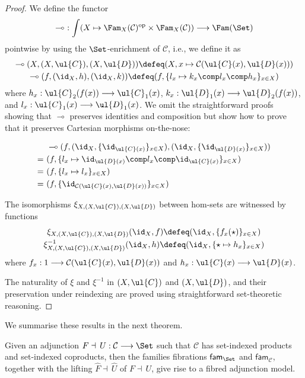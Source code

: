\begin{proof}
We define the functor 
\[
\multimap \,\,: \int (X \mapsto \Fam_X(\mathcal{C})^{\text{op}} \times \Fam_X(\mathcal{C})) \longrightarrow \Fam(\Set)
\]
pointwise by using the $\Set$-enrichment of $\mathcal{C}$, i.e., we define it as
\[
\begin{array}{c}
\multimap (X,(X,\ul{C}),(X,\ul{D})) \defeq (X,x \mapsto \mathcal{C}(\ul{C}(x),\ul{D}(x)))
\\[1mm]
\multimap (f,(\id_X,h),(\id_X,k)) \defeq (f, \{l_x \mapsto k_x \comp l_x \comp h_x\}_{x \in X})
\end{array}
\]
where $h_x : \ul{C}_2(f(x)) \longrightarrow \ul{C}_1(x)$, $k_x : \ul{D}_1(x) \longrightarrow \ul{D}_2(f(x))$,  and $l_x : \ul{C}_1(x) \longrightarrow \ul{D}_1(x)$. We omit the straightforward proofs showing that $\multimap$ preserves identities and composition but show how to prove that it preserves Cartesian morphisms on-the-nose:
\begin{fleqn}[0.3cm]
\begin{align*}
& \multimap (f,(\id_X,\{\id_{\ul{C}(x)}\}_{x \in X}),(\id_X,\{\id_{\ul{D}(x)}\}_{x \in X})) 
\\
=\,\, &
(f , \{l_x \mapsto \id_{\ul{D}(x)} \comp l_x \comp \id_{\ul{C}(x)}\}_{x \in X})
\\
=\,\, &
(f , \{l_x \mapsto l_x\}_{x \in X})
\\
=\,\, &
(f , \{\id_{\mathcal{C}(\ul{C}(x),\ul{D}(x))}\}_{x \in X})
\end{align*}
\end{fleqn}

The isomorphisms $\xi_{X,(X,\ul{C}),(X,\ul{D})}$ between hom-sets are witnessed by functions
\[
\begin{array}{c}
\xi_{X,(X,\ul{C}),(X,\ul{D})} (\id_X, f) \defeq (\id_X, \{f_x(\star)\}_{x \in X})
\\[1mm]
\xi_{X,(X,\ul{C}),(X,\ul{D})}^{-1} (\id_X, h) \defeq (\id_X, \{\star \mapsto h_x\}_{x \in X})
\end{array}
\]
where $f_x : 1 \longrightarrow \mathcal{C}(\ul{C}(x),\ul{D}(x))$ and $h_x : \ul{C}(x) \longrightarrow \ul{D}(x)$. 

The naturality of $\xi$ and $\xi^{-1}$ in $(X,\ul{C})$ and $(X,\ul{D})$, and their preservation under reindexing are proved using straightforward set-theoretic reasoning. 
\end{proof}

We summarise these results in the next theorem.

\begin{theorem}
\label{thm:liftedfibradjmodels}
Given an adjunction $F \dashv\, U : \mathcal{C} \longrightarrow \Set$ such that $\mathcal{C}$ has set-indexed products and set-indexed coproducts, then the families fibrations $\mathsf{fam}_{\Set}$ and $\mathsf{fam}_{\mathcal{C}}$, together with the lifting $\widehat{F} \dashv\, \widehat{U}$ of $F \dashv\, U$, give rise to a fibred adjunction model.
\end{theorem}

